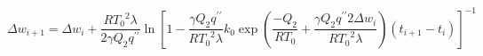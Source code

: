 \begin{equation}
    \label{eq:weight_gain_above_transition_thickness_ZIRLO_OptZIRLO}
    \Delta w_{i + 1} = \Delta w_{i} + \frac{R{T_{0}}^{2}\lambda}{2\gamma Q_{2}q^{\prime \prime}}{\ln\left\lbrack 1 - \frac{\gamma Q_{2}q^{\prime \prime}}{R{T_{0}}^{2}\lambda}k_{0}\exp\left( \frac{- Q_{2}}{RT_{0}}+\frac{\gamma Q_{2}q^{\prime \prime}2\Delta w_{i}}{R{T_{0}}^{2}\lambda}\right)\left( t_{i + 1} - t_{i} \right) \right\rbrack}^{- 1}
\end{equation}
